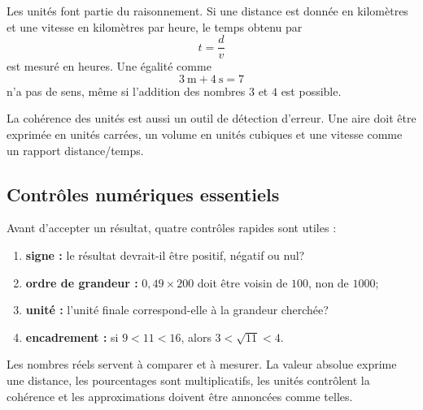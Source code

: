 Les unités font partie du raisonnement. Si une distance est donnée en kilomètres et une vitesse en kilomètres par heure, le temps obtenu par
\[
t=\frac d v
\]
est mesuré en heures. Une égalité comme
\[
3\ \mathrm{m}+4\ \mathrm{s}=7
\]
n'a pas de sens, même si l'addition des nombres $3$ et $4$ est possible.

La cohérence des unités est aussi un outil de détection d'erreur. Une aire doit être exprimée en unités carrées, un volume en unités cubiques et une vitesse comme un rapport distance/temps.

\subsection{Contrôles numériques essentiels}

Avant d'accepter un résultat, quatre contrôles rapides sont utiles :
\begin{enumerate}
\item \textbf{signe :} le résultat devrait-il être positif, négatif ou nul?
\item \textbf{ordre de grandeur :} $0{,}49\times200$ doit être voisin de $100$, non de $1000$;
\item \textbf{unité :} l'unité finale correspond-elle à la grandeur cherchée?
\item \textbf{encadrement :} si $9<11<16$, alors $3<\sqrt{11}<4$.
\end{enumerate}

\begin{summarybox}
Les nombres réels servent à comparer et à mesurer. La valeur absolue exprime une distance, les pourcentages sont multiplicatifs, les unités contrôlent la cohérence et les approximations doivent être annoncées comme telles.
\end{summarybox}

